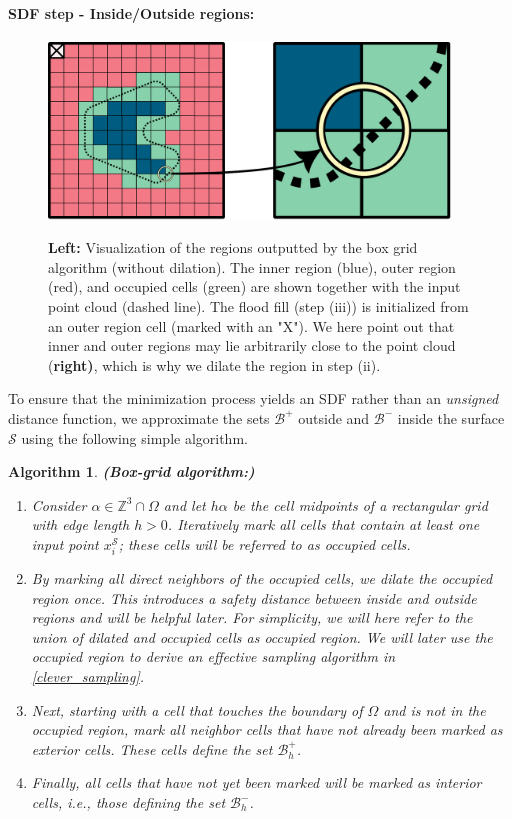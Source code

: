 \documentclass[draft,12pt,openany]{book}
\def\S{\mathcal{S}}
\theoremstyle{plainnormal}
\newtheorem{algorithm}[theorem]{Algorithm}
\theoremstyle{remark}
\begin{document}
\paragraph{SDF step - Inside/Outside regions:}
\begin{figure}[!b]
    \centering
    \includegraphics[width = 0.95\textwidth]{Figures/InnerOuter.pdf}\label{InnerOuter}
    \caption{\textbf{Left:} Visualization of the regions outputted by the box grid algorithm (without dilation). The inner region (blue), outer region (red), and occupied cells (green) are shown together with the input point cloud (dashed line). The flood fill (step (iii)) is initialized from an outer region cell (marked with an "X"). We here point out that inner and outer regions may lie arbitrarily close to the point cloud (\textbf{right)}, which is why we dilate the region in step (ii).
}
\end{figure}
To ensure that the minimization process yields an SDF rather than an \emph{unsigned} distance function, we approximate the sets $\mathcal{B}^+$ outside and $\mathcal{B}^-$ inside the surface $\mathcal{S}$ using the following simple algorithm.
\begin{algorithm}\textbf{(Box-grid algorithm:)}\label{box_algorithm}
\begin{enumerate}
    \item Consider $\alpha \in \mathbb{Z}^3\cap\Omega$ and let $h\alpha $ be the cell midpoints of a rectangular grid with edge length $h > 0$. Iteratively mark all cells that contain at least one input point $x_i^\S$; these cells will be referred to as \emph{occupied cells}.
    \item By marking all direct neighbors of the occupied cells, we dilate the occupied region once. This introduces a safety distance between inside and outside regions and will be helpful later. For simplicity, we will here refer to the union of dilated and occupied cells as \emph{occupied region}. We will later use the occupied region to derive an effective sampling algorithm in \ref{clever_sampling}.
    \item Next, starting with a cell that touches the boundary of $\Omega$ and is not in the occupied region, mark all neighbor cells that have not already been marked as \emph{exterior cells}. These cells define the set $\mathcal{B}^+_h$.
    \item Finally, all cells that have not yet been marked will be marked as \emph{interior cells}, i.e., those defining the set $\mathcal{B}_h^-$.
    \end{enumerate}
\end{algorithm}
\end{document}
